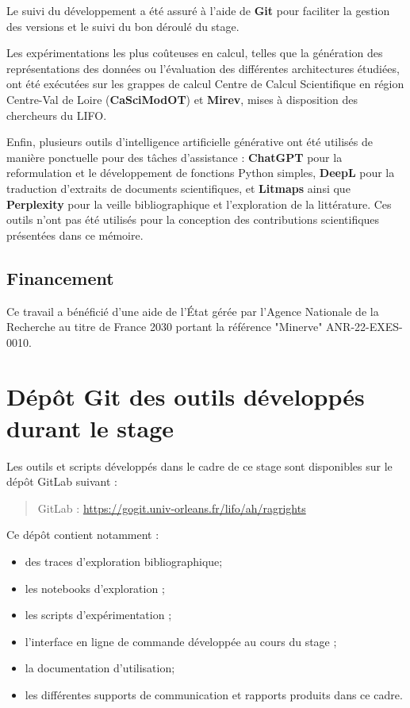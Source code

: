     Le suivi du développement a été assuré à l'aide de \textbf{Git} pour faciliter la gestion des versions et le suivi du bon déroulé du stage.
    
    Les expérimentations les plus coûteuses en calcul, telles que la génération des représentations des données ou l'évaluation des différentes architectures étudiées, ont été exécutées sur les grappes de calcul Centre de Calcul Scientifique en région Centre-Val de Loire (\textbf{CaSciModOT}) et \textbf{Mirev}, mises à disposition des chercheurs du LIFO.
    
    Enfin, plusieurs outils d'intelligence artificielle générative ont été utilisés de manière ponctuelle pour des tâches d'assistance : \textbf{ChatGPT} pour la reformulation et le développement de fonctions Python simples, \textbf{DeepL} pour la traduction d'extraits de documents scientifiques, et \textbf{Litmaps} ainsi que \textbf{Perplexity} pour la veille bibliographique et l'exploration de la littérature. Ces outils n'ont pas été utilisés pour la conception des contributions scientifiques présentées dans ce mémoire.


    \section{Financement}

    Ce travail a bénéficié d'une aide de l’État gérée par l'Agence Nationale de la Recherche au titre de France 2030 portant la référence "Minerve" ANR-22-EXES-0010.


\chapter{Dépôt Git des outils développés durant le stage}

Les outils et scripts développés dans le cadre de ce stage sont disponibles sur le dépôt GitLab suivant :

\begin{quote}
GitLab : \url{https://gogit.univ-orleans.fr/lifo/ah/ragrights}
\end{quote}

Ce dépôt contient notamment :

\begin{itemize}
    \item des traces d'exploration bibliographique;
    \item les notebooks d'exploration ;
    \item les scripts d'expérimentation ;
    \item l'interface en ligne de commande développée au cours du stage ;
    \item la documentation d'utilisation;
    \item les différentes supports de communication et rapports produits dans ce cadre.
\end{itemize}



